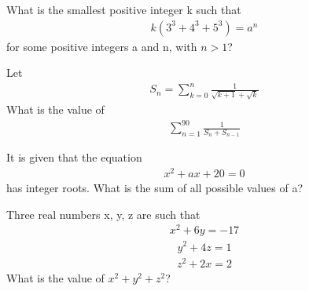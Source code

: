 \item What is the smallest positive integer k such that
\begin{align}
k(3^3 + 4^3 + 5^3) = a^n
\end{align}
for some positive integers a and n, with $n > 1$?

\item Let
\begin{align*}
S_n = \sum_{k=0}^{n}\frac{1}{\sqrt{k + 1} + \sqrt{k}}
\end{align*}
What is the value of 
\begin{align*}
\sum_{n=1}^{90}\frac{1}{S_n + S_{n - 1}}
\end{align*}

\item It is given that the equation
\begin{align}
x^2 + ax + 20 = 0
\end{align}
has integer roots. What is the sum of all possible values of a?

\item Three real numbers x, y, z are such that
\begin{align}
x^2 + 6y = -17
\end{align}
\begin{align}
y^2 + 4z = 1
\end{align}
\begin{align}
z^2 + 2x = 2
\end{align}
What is the value of $x^2 + y^2 + z^2$?

